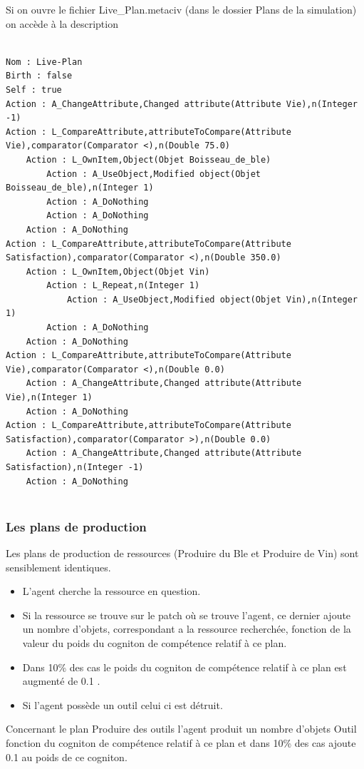 \documentclass[a4paper,oneside,12 pt]{article}
\begin{document}
Si on ouvre le fichier Live\_Plan.metaciv (dans le dossier Plans de la simulation) on accède à la description
	\begin{verbatim}

Nom : Live-Plan
Birth : false   
Self : true
Action : A_ChangeAttribute,Changed attribute(Attribute Vie),n(Integer -1)
Action : L_CompareAttribute,attributeToCompare(Attribute Vie),comparator(Comparator <),n(Double 75.0)
	Action : L_OwnItem,Object(Objet Boisseau_de_ble)
		Action : A_UseObject,Modified object(Objet Boisseau_de_ble),n(Integer 1)
		Action : A_DoNothing
		Action : A_DoNothing
	Action : A_DoNothing
Action : L_CompareAttribute,attributeToCompare(Attribute Satisfaction),comparator(Comparator <),n(Double 350.0)
	Action : L_OwnItem,Object(Objet Vin)
		Action : L_Repeat,n(Integer 1)
			Action : A_UseObject,Modified object(Objet Vin),n(Integer 1)
		Action : A_DoNothing
	Action : A_DoNothing
Action : L_CompareAttribute,attributeToCompare(Attribute Vie),comparator(Comparator <),n(Double 0.0)
	Action : A_ChangeAttribute,Changed attribute(Attribute Vie),n(Integer 1)
	Action : A_DoNothing
Action : L_CompareAttribute,attributeToCompare(Attribute Satisfaction),comparator(Comparator >),n(Double 0.0)
	Action : A_ChangeAttribute,Changed attribute(Attribute Satisfaction),n(Integer -1)
	Action : A_DoNothing
	
	\end{verbatim}	

\subsubsection{Les plans de production}
	Les plans de production de ressources (Produire du Ble et Produire de Vin) sont sensiblement identiques.
	
\begin{itemize}
\item L'agent cherche la ressource en question.
\item Si la ressource se trouve sur le patch où se trouve l'agent, ce dernier ajoute un nombre d'objets, correspondant a la ressource recherchée, fonction de la valeur du poids du cogniton de compétence relatif à ce plan.
\item Dans 10\% des cas le poids du cogniton de compétence relatif à ce plan est augmenté de 0.1 .
\item Si l'agent possède un outil celui ci est détruit.

\end{itemize}

Concernant le plan Produire des outils l'agent produit un nombre d'objets Outil fonction du cogniton de compétence relatif à ce plan et dans 10\% des cas ajoute 0.1 au poids de ce cogniton.
\end{document}
